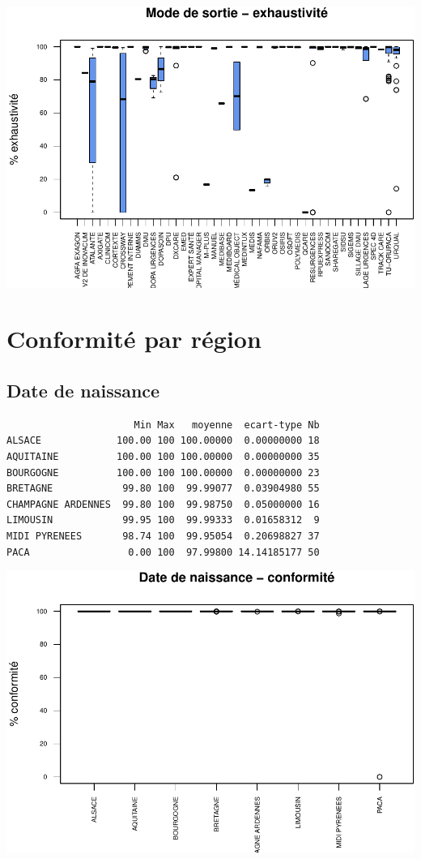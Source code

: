 \documentclass[]{article}
\begin{document}
\includegraphics{septembre2015_files/figure-latex/unnamed-chunk-24-1.pdf}

\section{Conformité par région}\label{conformite-par-region}

\subsection{Date de naissance}\label{date-de-naissance-1}

\begin{verbatim}
                      Min Max   moyenne  ecart-type Nb
ALSACE             100.00 100 100.00000  0.00000000 18
AQUITAINE          100.00 100 100.00000  0.00000000 35
BOURGOGNE          100.00 100 100.00000  0.00000000 23
BRETAGNE            99.80 100  99.99077  0.03904980 55
CHAMPAGNE ARDENNES  99.80 100  99.98750  0.05000000 16
LIMOUSIN            99.95 100  99.99333  0.01658312  9
MIDI PYRENEES       98.74 100  99.95054  0.20698827 37
PACA                 0.00 100  97.99800 14.14185177 50
\end{verbatim}

\includegraphics{septembre2015_files/figure-latex/unnamed-chunk-25-1.pdf}
\end{document}
